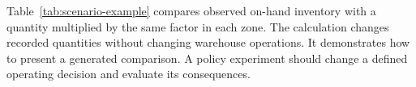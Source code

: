 \documentclass[conference]{IEEEtran}
\begin{document}

Table~\ref{tab:scenario-example} compares observed on-hand inventory with a quantity
multiplied by the same factor in each zone. The calculation changes recorded
quantities without changing warehouse operations.
It demonstrates how to present a generated comparison. A policy experiment
should change a defined operating decision and evaluate its consequences.

\begin{table}[H]
\caption{\scenarioCaptionFinding}
\label{tab:scenario-example}
\centering
\footnotesize
\setlength{\tabcolsep}{3pt}

\end{table}





\end{document}
